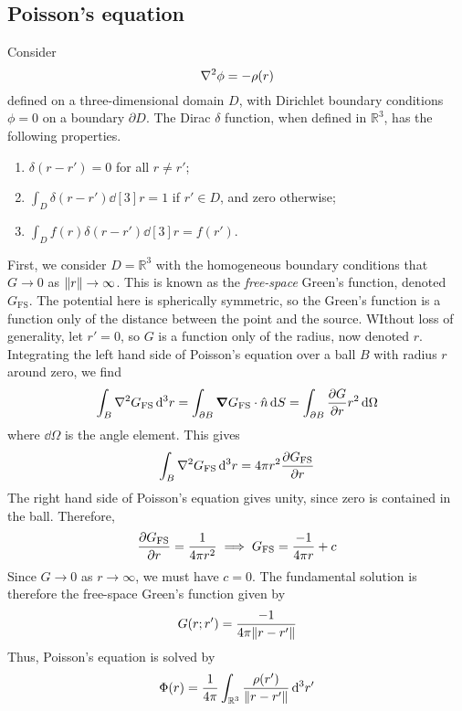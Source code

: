 \subsection{Poisson's equation}
Consider
\[
	\laplacian{\phi} = - \rho(r)
\]
defined on a three-dimensional domain \( D \), with Dirichlet boundary conditions \( \phi = 0 \) on a boundary \( \partial D \).
The Dirac \( \delta \) function, when defined in \( \mathbb R^3 \), has the following properties.
\begin{enumerate}
	\item \( \delta(r - r') = 0 \) for all \( r \neq r' \);
	\item \( \int_D \delta(r - r') \dd[3]{r} = 1 \) if \( r' \in D \), and zero otherwise;
	\item \( \int_D f(r) \delta(r - r') \dd[3]{r} = f(r') \).
\end{enumerate}
First, we consider \( D = \mathbb R^3 \) with the homogeneous boundary conditions that \( G \to 0 \) as \( \norm{r} \to \infty \).
This is known as the \textit{free-space} Green's function, denoted \( G_{\mathrm{FS}} \).
The potential here is spherically symmetric, so the Green's function is a function only of the distance between the point and the source.
WIthout loss of generality, let \( r' = 0 \), so \( G \) is a function only of the radius, now denoted \( r \).
Integrating the left hand side of Poisson's equation over a ball \( B \) with radius \( r \) around zero, we find
\[
	\int_B \laplacian{G_{\mathrm{FS}}} \dd[3]{r} = \int_{\partial B} \grad{G_{\mathrm{FS}}} \cdot \hat n \dd{S} = \int_{\partial B} \pdv{G}{r} r^2 \dd{\Omega}
\]
where \( \dd{\Omega} \) is the angle element.
This gives
\[
	\int_B \laplacian{G_{\mathrm{FS}}} \dd[3]{r} = 4 \pi r^2 \pdv{G_{\mathrm{FS}}}{r}
\]
The right hand side of Poisson's equation gives unity, since zero is contained in the ball.
Therefore,
\[
	\pdv{G_{\mathrm{FS}}}{r} = \frac{1}{4 \pi r^2} \implies G_{\mathrm{FS}} = \frac{-1}{4 \pi r} + c
\]
Since \( G \to 0 \) as \( r \to \infty \), we must have \( c = 0 \).
The fundamental solution is therefore the free-space Green's function given by
\[
	G(r; r') = \frac{-1}{4 \pi \norm{r - r'}}
\]
Thus, Poisson's equation is solved by
\[
	\Phi(r) = \frac{1}{4 \pi} \int_{\mathbb R^3} \frac{\rho(r')}{\norm{r - r'}} \dd[3]{r'}
\]

